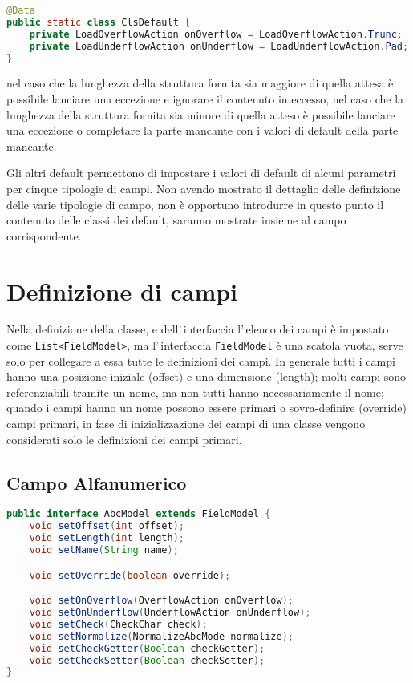 \documentclass[a4paper,10pt]{report}
\begin{document}
\begin{lstlisting}[language=java, caption=classe ClsDefault, 
label=code:ClsDefault]
@Data
public static class ClsDefault {
    private LoadOverflowAction onOverflow = LoadOverflowAction.Trunc;   // enum {Error, Trunc}
    private LoadUnderflowAction onUnderflow = LoadUnderflowAction.Pad;  // enum {Error, Pad}
}
\end{lstlisting}
nel caso che la lunghezza della struttura fornita sia maggiore di quella attesa
è possibile lanciare una eccezione e ignorare il contenuto in eccesso,
nel caso che la lunghezza della struttura fornita sia minore di quella atteso è
possibile lanciare una eccezione o completare la parte mancante con i valori di
default della parte mancante.

Gli altri default permettono di impostare i valori di default di alcuni 
parametri per cinque tipologie di campi. Non avendo mostrato il dettaglio delle 
definizione delle varie tipologie di campo, non è opportuno introdurre in 
questo punto il contenuto delle classi dei default, saranno mostrate insieme al 
campo corrispondente.

\section{Definizione di campi}
Nella definizione della classe, e dell'\,interfaccia l'\,elenco dei campi è
impostato come \verb!List<FieldModel>!, ma l'\,interfaccia \verb!FieldModel! è
una scatola vuota, serve solo per collegare a essa tutte le definizioni dei
campi. In generale tutti i campi hanno una posizione iniziale (offset) e una
dimensione (length); molti campi sono referenziabili tramite un nome, 
ma non tutti hanno necessariamente il nome; quando i campi hanno un nome
possono essere primari o sovra-definire (override) campi primari, in fase di 
inizializzazione dei campi di una classe vengono considerati solo le definizioni
dei campi primari.

\subsection{Campo Alfanumerico}

\begin{lstlisting}[language=java, caption=interfaccia AbcModel, 
label=code:AbcModel]
public interface AbcModel extends FieldModel {
    void setOffset(int offset);
    void setLength(int length);
    void setName(String name);

    void setOverride(boolean override);

    void setOnOverflow(OverflowAction onOverflow);
    void setOnUnderflow(UnderflowAction onUnderflow);
    void setCheck(CheckChar check);
    void setNormalize(NormalizeAbcMode normalize);
    void setCheckGetter(Boolean checkGetter);
    void setCheckSetter(Boolean checkSetter);
}
\end{lstlisting}
\end{document}
